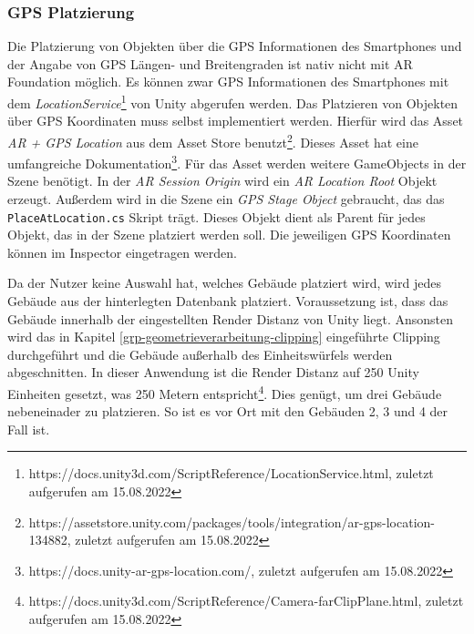 \subsubsection{GPS Platzierung}
\label{technische-umsetzung-platzierung-gps}
Die Platzierung von Objekten über die GPS Informationen des Smartphones und der Angabe von GPS Längen- und Breitengraden ist nativ nicht mit AR Foundation möglich. Es können zwar GPS Informationen des Smartphones mit dem \textit{LocationService}\footnote{https://docs.unity3d.com/ScriptReference/LocationService.html, zuletzt aufgerufen am 15.08.2022} von Unity abgerufen werden. Das Platzieren von Objekten über GPS Koordinaten muss selbst implementiert werden. Hierfür wird das Asset \textit{AR + GPS Location} aus dem Asset Store benutzt\footnote{https://assetstore.unity.com/packages/tools/integration/ar-gps-location-134882, zuletzt aufgerufen am 15.08.2022}. Dieses Asset hat eine umfangreiche Dokumentation\footnote{https://docs.unity-ar-gps-location.com/, zuletzt aufgerufen am 15.08.2022}. Für das Asset werden weitere GameObjects in der Szene benötigt. In der \textit{AR Session Origin} wird ein \textit{AR Location Root} Objekt erzeugt. Außerdem wird in die Szene ein \textit{GPS Stage Object} gebraucht, das das \texttt{PlaceAtLocation.cs} Skript trägt. Dieses Objekt dient als Parent für jedes Objekt, das in der Szene platziert werden soll. Die jeweiligen GPS Koordinaten können im Inspector eingetragen werden. 

Da der Nutzer keine Auswahl hat, welches Gebäude platziert wird, wird jedes Gebäude aus der hinterlegten Datenbank platziert. Voraussetzung ist, dass das Gebäude innerhalb der eingestellten Render Distanz von Unity liegt. Ansonsten wird das in Kapitel \ref*{grp-geometrieverarbeitung-clipping} eingeführte Clipping durchgeführt und die Gebäude außerhalb des Einheitswürfels werden abgeschnitten. In dieser Anwendung ist die Render Distanz auf 250 Unity Einheiten gesetzt, was 250 Metern entspricht\footnote{https://docs.unity3d.com/ScriptReference/Camera-farClipPlane.html, zuletzt aufgerufen am 15.08.2022}. Dies genügt, um drei Gebäude nebeneinader zu platzieren. So ist es vor Ort mit den Gebäuden 2, 3 und 4 der Fall ist. 

